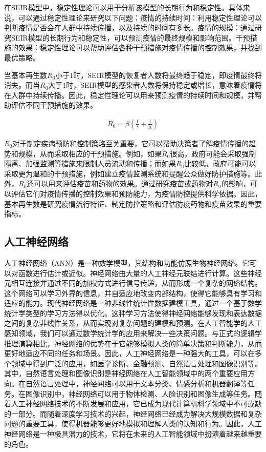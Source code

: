 在SEIR模型中，稳定性理论可以用于分析该模型的长期行为和稳定性。具体来说，可以通过稳定性理论来研究以下问题：疫情的持续时间：利用稳定性理论可以判断疫情是否会在人群中持续传播，以及持续的时间有多长。疫情的规模：通过研究SEIR模型的长期行为和稳定性，可以预测疫情的最终规模和影响范围。干预措施的效果：稳定性理论可以帮助评估各种干预措施对疫情传播的控制效果，并找到最优策略。

当基本再生数$R_0$小于1时，SEIR模型的恢复者人数将最终趋于稳定，即疫情最终将消失。而当$R_0$大于1时，SEIR模型的感染者人数将保持稳定或增长，意味着疫情将在人群中持续传播。因此，稳定性理论可以用来预测疫情的持续时间和规模，并帮助评估不同干预措施的效果。

\begin{gather}
    R_0 = \beta  (\frac{1}{\gamma}+\frac{1}{\alpha})
\end{gather}

$R_0$对于制定疾病预防和控制策略至关重要，它可以帮助决策者了解疫情传播的趋势和规模，从而采取相应的干预措施。例如，如果$R_0$很高，政府可能会采取强制隔离、加强监测等措施来限制人员流动和传播；而如果$R_0$比较低，政府可能可以采取更为温和的干预措施，例如建立疫情监测系统和提醒公众做好防护措施等。此外，$R_0$还可以用来评估疫苗和药物的效果。通过研究疫苗或药物对$R_0$的影响，可以评估它们对疫情传播的控制效果和预防能力，为疫情防控提供科学依据。因此，基本再生数是研究疫情流行特征、制定防控策略和评估防疫药物和疫苗效果的重要指标。

\subsection{人工神经网络}
人工神经网络（ANN）是一种数学模型，其结构和功能仿照生物神经网络。它可以对函数进行估计或近似。神经网络由大量的人工神经元联结进行计算。这些神经元相互连接并通过不同的加权方式进行信号传递，从而形成一个复杂的网络结构。这个网络可以学习外界的信息，并自适应地改变内部结构，使得它能够具有学习和适应的能力。现代神经网络是一种非线性统计性数据建模工具，通过一个基于数学统计学类型的学习方法得以优化。这种学习方法使得神经网络能够发现和表达数据之间的复杂非线性关系，从而实现对复杂问题的建模和预测。在人工智能学的人工感知领域，我们可以通过数学统计学的应用来解决一些决策问题。与正式的逻辑学推理演算相比，神经网络的优势在于它能够模拟人类的简单决策和判断能力，从而更好地适应不同的任务和场景。因此，人工神经网络是一种强大的工具，可以在多个领域中得到广泛的应用，如医学诊断、金融预测、自然语言处理和图像识别等。其中，自然语言处理和图像识别是神经网络在人工智能领域中的两个重要应用方向。在自然语言处理中，神经网络可以用于文本分类、情感分析和机器翻译等任务。在图像识别中，神经网络可以用于物体检测、人脸识别和图像生成等任务。随着人工神经网络技术的不断发展和应用，它已成为现代计算机科学领域中不可或缺的一部分。而随着深度学习技术的兴起，神经网络已经成为解决大规模数据和复杂问题的重要工具，使得机器能够更好地模拟和理解人类的认知和行为。因此，人工神经网络是一种极具潜力的技术，它将在未来的人工智能领域中扮演着越来越重要的角色。


